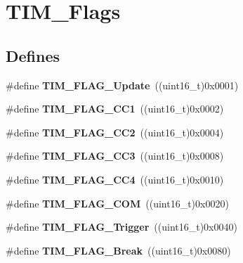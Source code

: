 \hypertarget{group__TIM__Flags}{
\section{TIM\_\-Flags}
\label{group__TIM__Flags}
}
\subsection*{Defines}
\begin{DoxyCompactItemize}
\item 
\hypertarget{group__TIM__Flags_ga97eba66f792c88e08131bd0d2a0e530d}{
\#define {\bfseries TIM\_\-FLAG\_\-Update}~((uint16\_\-t)0x0001)}
\label{group__TIM__Flags_ga97eba66f792c88e08131bd0d2a0e530d}

\item 
\hypertarget{group__TIM__Flags_gaa7eb8be054b9bd217a9abb1c8687cc55}{
\#define {\bfseries TIM\_\-FLAG\_\-CC1}~((uint16\_\-t)0x0002)}
\label{group__TIM__Flags_gaa7eb8be054b9bd217a9abb1c8687cc55}

\item 
\hypertarget{group__TIM__Flags_ga9cae242f1c51b31839ffc5bc007c82a7}{
\#define {\bfseries TIM\_\-FLAG\_\-CC2}~((uint16\_\-t)0x0004)}
\label{group__TIM__Flags_ga9cae242f1c51b31839ffc5bc007c82a7}

\item 
\hypertarget{group__TIM__Flags_ga052c380f922219659810e4fceb574a7c}{
\#define {\bfseries TIM\_\-FLAG\_\-CC3}~((uint16\_\-t)0x0008)}
\label{group__TIM__Flags_ga052c380f922219659810e4fceb574a7c}

\item 
\hypertarget{group__TIM__Flags_gafd0dc57b56941f8b8250d66e289542db}{
\#define {\bfseries TIM\_\-FLAG\_\-CC4}~((uint16\_\-t)0x0010)}
\label{group__TIM__Flags_gafd0dc57b56941f8b8250d66e289542db}

\item 
\hypertarget{group__TIM__Flags_gad454d70205ce5bbf3b3c0e7e43d6df62}{
\#define {\bfseries TIM\_\-FLAG\_\-COM}~((uint16\_\-t)0x0020)}
\label{group__TIM__Flags_gad454d70205ce5bbf3b3c0e7e43d6df62}

\item 
\hypertarget{group__TIM__Flags_gaeca2f17eea738dbec7eee8ecbe442814}{
\#define {\bfseries TIM\_\-FLAG\_\-Trigger}~((uint16\_\-t)0x0040)}
\label{group__TIM__Flags_gaeca2f17eea738dbec7eee8ecbe442814}

\item 
\hypertarget{group__TIM__Flags_ga166571a1d5ca2bfca5d923eaa22f6deb}{
\#define {\bfseries TIM\_\-FLAG\_\-Break}~((uint16\_\-t)0x0080)}
\label{group__TIM__Flags_ga166571a1d5ca2bfca5d923eaa22f6deb}


\end{DoxyCompactItemize}
